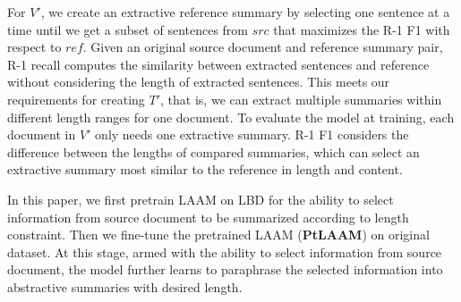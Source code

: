 For $V'$, we create an extractive reference summary by selecting one sentence at a time 
until we get a subset of sentences from $src$ that maximizes the R-1 F1 
with respect to $ref$. 
Given an original source document and reference summary pair, 
R-1 recall computes the similarity between extracted sentences and reference without considering the length of extracted sentences.
This meets our requirements for creating $T'$, that is, we can extract multiple summaries within different length ranges for one document.
To evaluate the model at training,
each document in $V'$ only needs one extractive summary.
R-1 F1 considers the difference between the lengths of compared summaries, 
which can select an extractive summary most similar to the reference in length and content.


In this paper, we first pretrain LAAM on LBD for the ability to select information from source document to be summarized according to length constraint.
Then we fine-tune the pretrained LAAM ({\bf PtLAAM}) on original dataset.
At this stage, armed with the ability to select information from source document, 
the model further learns to paraphrase the selected information into 
abstractive summaries with desired length.

